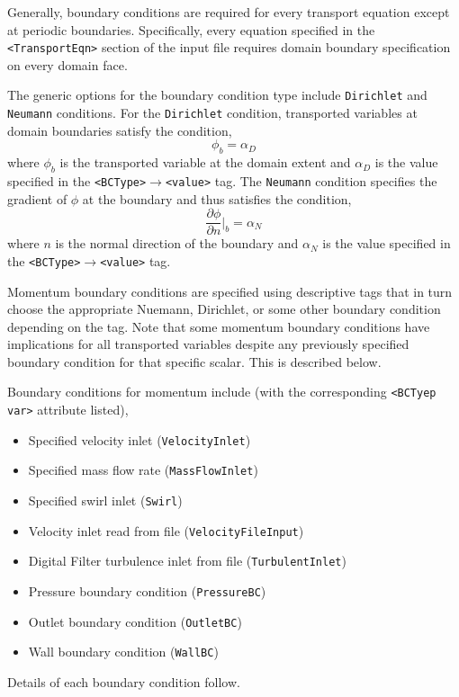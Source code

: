 Generally, boundary conditions are required for every transport equation except at periodic boundaries.  Specifically, every equation specified in the \verb=<TransportEqn>= section of the input file requires domain boundary specification on every domain face.  

The generic options for the boundary condition type include \verb=Dirichlet= and \verb=Neumann= conditions.  For the \verb=Dirichlet= condition, transported variables at domain boundaries satisfy the condition, 
%
\begin{equation}
\phi_b = \alpha_D
\end{equation}
%
where $\phi_b$ is the transported variable at the domain extent and $\alpha_D$ is the value specified in the \verb=<BCType>=$\rightarrow$\verb=<value>= tag. The \verb=Neumann= condition specifies the gradient of $\phi$ at the boundary and thus satisfies the condition, 
%
\begin{equation}
\frac{\partial \phi}{\partial n}|_b = \alpha_N
\end{equation}
%
where $n$ is the normal direction of the boundary and $\alpha_N$ is the value specified in the \verb=<BCType>=$\rightarrow$\verb=<value>= tag.  

Momentum boundary conditions are specified using descriptive tags that in turn choose the appropriate Nuemann, Dirichlet, or some other boundary condition depending on the tag.  Note that some momentum boundary conditions have implications for all transported variables despite any previously specified boundary condition for that specific scalar.  This is described below.  

Boundary conditions for momentum include (with the corresponding \verb=<BCTyep var>= attribute listed), 
%
\begin{itemize}
\item Specified velocity inlet (\verb=VelocityInlet=)
\item Specified mass flow rate (\verb=MassFlowInlet=)
\item Specified swirl inlet (\verb=Swirl=)
\item Velocity inlet read from file (\verb=VelocityFileInput=)
\item Digital Filter turbulence inlet from file (\verb=TurbulentInlet=)
\item Pressure boundary condition (\verb=PressureBC=)
\item Outlet boundary condition (\verb=OutletBC=)
\item Wall boundary condition (\verb=WallBC=)
\end{itemize}
%
Details of each boundary condition follow.

